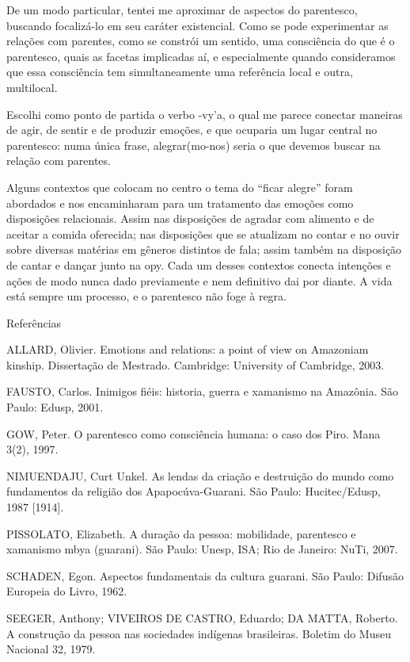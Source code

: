 \documentclass{article}
\begin{document}
De um modo particular, tentei me aproximar de aspectos do parentesco,
buscando focaliz\'a-lo em seu car\'ater existencial. Como se pode
experimentar as rela\c{c}\~oes com parentes, como se constr\'oi um
sentido, uma consci\^encia do que \'e o parentesco, quais as facetas
implicadas a\'i, e especialmente quando consideramos que essa
consci\^encia tem simultaneamente uma refer\^encia local e outra,
multilocal.

Escolhi como ponto de partida o verbo -vy{\textquoteright}a, o qual me
parece conectar maneiras de agir, de sentir e de produzir
emo\c{c}\~oes, e que ocuparia um lugar central no parentesco: numa
\'unica frase, alegrar(mo-nos) seria o que devemos buscar na
rela\c{c}\~ao com parentes. 

Alguns contextos que colocam no centro o tema do
{\textquotedblleft}ficar alegre{\textquotedblright} foram abordados e
nos encaminharam para um tratamento das emo\c{c}\~oes como
disposi\c{c}\~oes relacionais. Assim nas disposi\c{c}\~oes de agradar
com alimento e de aceitar a comida oferecida; nas disposi\c{c}\~oes que
se atualizam no contar e no ouvir sobre diversas mat\'erias em
g\^eneros distintos de fala; assim tamb\'em na disposi\c{c}\~ao de
cantar e dan\c{c}ar junto na opy. Cada um desses contextos conecta
inten\c{c}\~oes e a\c{c}\~oes de modo nunca dado previamente e nem
definitivo dai por diante. A vida est\'a sempre um processo, e o
parentesco n\~ao foge \`a regra.

Refer\^encias 

ALLARD, Olivier. Emotions and relations: a point of view on Amazoniam
kinship. Disserta\c{c}\~ao de Mestrado. Cambridge: University of
Cambridge, 2003.

FAUSTO, Carlos. Inimigos fi\'eis: historia, guerra e xamanismo na
Amaz\^onia. S\~ao Paulo: Edusp, 2001.

GOW, Peter. O parentesco como consci\^encia humana: o caso dos Piro.
Mana 3(2), 1997.

NIMUENDAJU, Curt Unkel. As lendas da cria\c{c}\~ao e destrui\c{c}\~ao do
mundo como fundamentos da religi\~ao dos Apapoc\'uva-Guarani. S\~ao
Paulo: Hucitec/Edusp, 1987 [1914].

PISSOLATO, Elizabeth. A dura\c{c}\~ao da pessoa: mobilidade, parentesco
e xamanismo mbya (guarani). S\~ao Paulo: Unesp, ISA; Rio de Janeiro:
NuTi, 2007.

SCHADEN, Egon. Aspectos fundamentais da cultura guarani. S\~ao Paulo:
Difus\~ao Europeia do Livro, 1962.

SEEGER, Anthony; VIVEIROS DE CASTRO, Eduardo; DA MATTA, Roberto. A
constru\c{c}\~ao da pessoa nas sociedades ind\'igenas brasileiras.
Boletim do Museu Nacional 32, 1979.
\end{document}
